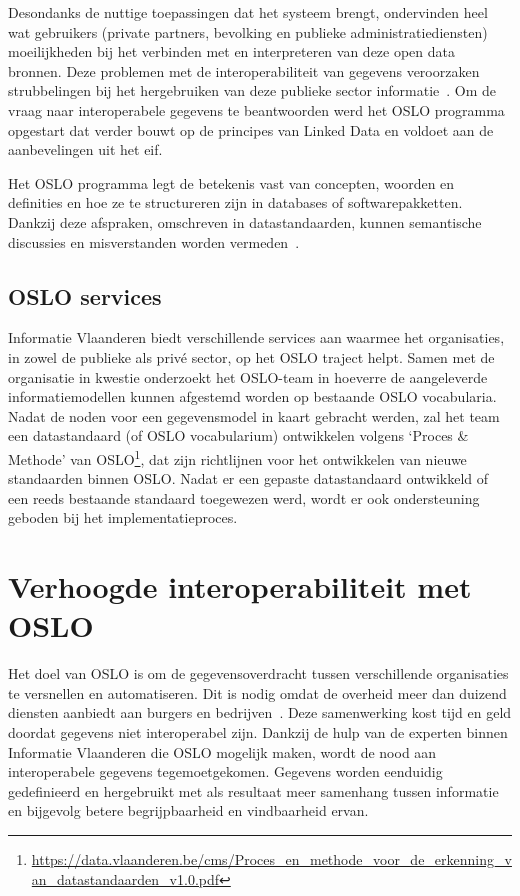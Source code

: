 Desondanks de nuttige toepassingen dat het systeem brengt, ondervinden heel wat gebruikers (private partners, bevolking en publieke administratiediensten) moeilijkheden bij het verbinden met en interpreteren van deze open data bronnen. Deze problemen met de interoperabiliteit van gegevens veroorzaken strubbelingen bij het hergebruiken van deze publieke sector informatie~\cite{opengovernment}. Om de vraag naar interoperabele gegevens te beantwoorden werd het OSLO programma opgestart dat verder bouwt op de principes van Linked Data en voldoet aan de aanbevelingen uit het \acrshort{eif}.

Het OSLO programma legt de betekenis vast van concepten, woorden en definities en hoe ze te structureren zijn in databases of softwarepakketten. Dankzij deze afspraken, omschreven in datastandaarden, kunnen semantische discussies en misverstanden worden vermeden~\cite{OSLO_handleiding}.

\subsection{OSLO services}
Informatie Vlaanderen biedt verschillende services aan waarmee het organisaties, in zowel de publieke als privé sector, op het OSLO traject helpt. Samen met de organisatie in kwestie onderzoekt het OSLO-team in hoeverre de aangeleverde informatiemodellen kunnen afgestemd worden op bestaande OSLO vocabularia. Nadat de noden voor een gegevensmodel in kaart gebracht werden, zal het team een datastandaard (of OSLO vocabularium) ontwikkelen volgens `Proces \& Methode' van OSLO\footnote{\url{https://data.vlaanderen.be/cms/Proces_en_methode_voor_de_erkenning_van_datastandaarden_v1.0.pdf}}, dat zijn richtlijnen voor het ontwikkelen van nieuwe standaarden binnen OSLO. Nadat er een gepaste datastandaard ontwikkeld of een reeds bestaande standaard toegewezen werd, wordt er ook ondersteuning geboden bij het implementatieproces.

\section{Verhoogde interoperabiliteit met OSLO}
Het doel van OSLO is om de gegevensoverdracht tussen verschillende organisaties te versnellen en automatiseren. Dit is nodig omdat de overheid meer dan duizend diensten aanbiedt aan burgers en bedrijven~\cite{OSLO_handleiding}. Deze samenwerking kost tijd en geld doordat gegevens niet interoperabel zijn. Dankzij de hulp van de experten binnen Informatie Vlaanderen die OSLO mogelijk maken, wordt de nood aan interoperabele gegevens tegemoetgekomen. Gegevens worden eenduidig gedefinieerd en hergebruikt met als resultaat meer samenhang tussen informatie en bijgevolg betere begrijpbaarheid en vindbaarheid ervan.

